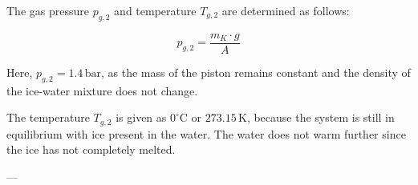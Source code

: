The gas pressure \( p_{g,2} \) and temperature \( T_{g,2} \) are determined as follows:  

\[
p_{g,2} = \frac{m_K \cdot g}{A}
\]

Here, \( p_{g,2} = 1.4 \, \text{bar} \), as the mass of the piston remains constant and the density of the ice-water mixture does not change.  

The temperature \( T_{g,2} \) is given as \( 0^\circ\text{C} \) or \( 273.15 \, \text{K} \), because the system is still in equilibrium with ice present in the water. The water does not warm further since the ice has not completely melted.  

---